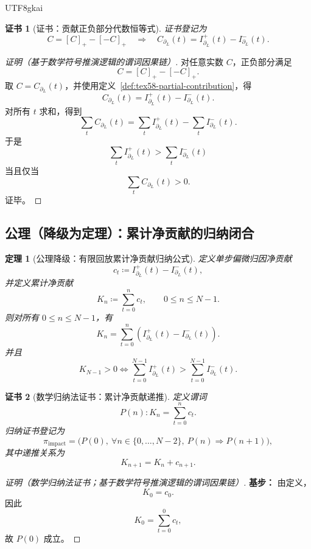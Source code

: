 \documentclass[12pt]{article}
\newtheorem{theorem}{定理}[section]
\newtheorem{Certificate}{证书}[section]
\newcommand{\DefEq}{\coloneqq}
\begin{document}
\begin{CJK*}{UTF8}{gkai}
\begin{Certificate}[证书：贡献正负部分代数恒等式]
\label{cert:tex58-impact-decomposition}
证书登记为
\[
  C=[C]_+-[-C]_+
  \quad\Longrightarrow\quad
  C_{\partial_L}(t)
  =
  I^+_{\partial_L}(t)-I^-_{\partial_L}(t).
\]
\end{Certificate}

\begin{proof}[证明（基于数学符号推演逻辑的谓词因果链）]
对任意实数 \(C\)，正负部分满足
\[
  C=[C]_+-[-C]_+.
\]
取 \(C=C_{\partial_L}(t)\)，并使用定义~\ref{def:tex58-partial-contribution}，得
\[
  C_{\partial_L}(t)
  =
  I^+_{\partial_L}(t)-I^-_{\partial_L}(t).
\]
对所有 \(t\) 求和，得到
\[
  \sum_t C_{\partial_L}(t)
  =
  \sum_t I^+_{\partial_L}(t)
  -
  \sum_t I^-_{\partial_L}(t).
\]
于是
\[
  \sum_t I^+_{\partial_L}(t)>\sum_t I^-_{\partial_L}(t)
\]
当且仅当
\[
  \sum_t C_{\partial_L}(t)>0.
\]
证毕。
\end{proof}

\subsection{公理（降级为定理）：累计净贡献的归纳闭合}
\label{subsec:tex58-impact-induction}

\begin{theorem}[公理降级：有限回放累计净贡献归纳公式]
\label{thm:tex58-impact-induction}
定义单步偏微归因净贡献
\[
  c_t
  \DefEq
  I^+_{\partial_L}(t)-I^-_{\partial_L}(t),
\]
并定义累计净贡献
\[
  K_n
  \DefEq
  \sum_{t=0}^{n}c_t,
  \qquad 0\le n\le N-1.
\]
则对所有 \(0\le n\le N-1\)，有
\[
  K_n
  =
  \sum_{t=0}^{n}
  \left(
  I^+_{\partial_L}(t)-I^-_{\partial_L}(t)
  \right).
\]
并且
\[
  K_{N-1}>0
  \Longleftrightarrow
  \sum_{t=0}^{N-1}I^+_{\partial_L}(t)
  >
  \sum_{t=0}^{N-1}I^-_{\partial_L}(t).
\]
\end{theorem}

\begin{Certificate}[数学归纳法证书：累计净贡献递推]
\label{cert:tex58-impact-induction}
定义谓词
\[
  P(n):
  K_n=
  \sum_{t=0}^{n}c_t.
\]
归纳证书登记为
\[
  \pi_{\mathrm{impact}}
  =
  \bigl(P(0),\ \forall n\in\{0,\ldots,N-2\},\ P(n)\Rightarrow P(n+1)\bigr),
\]
其中递推关系为
\[
  K_{n+1}=K_n+c_{n+1}.
\]
\end{Certificate}

\begin{proof}[证明（数学归纳法证书；基于数学符号推演逻辑的谓词因果链）]
\textbf{基步：}
由定义，
\[
  K_0=c_0.
\]
因此
\[
  K_0=\sum_{t=0}^{0}c_t,
\]
故 \(P(0)\) 成立。


\end{proof}
\end{CJK*}
\end{document}
